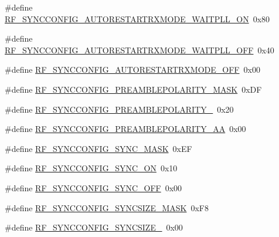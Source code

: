 \begin{DoxyCompactItemize}
\item 
\#define \mbox{\hyperlink{sx1276_regs-_fsk_8h_ab3b88dea45b78b60a8c5e684dae4ef82}{R\+F\+\_\+\+S\+Y\+N\+C\+C\+O\+N\+F\+I\+G\+\_\+\+A\+U\+T\+O\+R\+E\+S\+T\+A\+R\+T\+R\+X\+M\+O\+D\+E\+\_\+\+W\+A\+I\+T\+P\+L\+L\+\_\+\+ON}}~0x80
\item 
\#define \mbox{\hyperlink{sx1276_regs-_fsk_8h_a83c54f53204c35c3e78d90505218766b}{R\+F\+\_\+\+S\+Y\+N\+C\+C\+O\+N\+F\+I\+G\+\_\+\+A\+U\+T\+O\+R\+E\+S\+T\+A\+R\+T\+R\+X\+M\+O\+D\+E\+\_\+\+W\+A\+I\+T\+P\+L\+L\+\_\+\+O\+FF}}~0x40
\item 
\#define \mbox{\hyperlink{sx1276_regs-_fsk_8h_ac2c0f0cad363bba58dcdcc0bebbbbf56}{R\+F\+\_\+\+S\+Y\+N\+C\+C\+O\+N\+F\+I\+G\+\_\+\+A\+U\+T\+O\+R\+E\+S\+T\+A\+R\+T\+R\+X\+M\+O\+D\+E\+\_\+\+O\+FF}}~0x00
\item 
\#define \mbox{\hyperlink{sx1276_regs-_fsk_8h_aabfc2e96ddfb3844b90e9c9dc455dcaa}{R\+F\+\_\+\+S\+Y\+N\+C\+C\+O\+N\+F\+I\+G\+\_\+\+P\+R\+E\+A\+M\+B\+L\+E\+P\+O\+L\+A\+R\+I\+T\+Y\+\_\+\+M\+A\+SK}}~0x\+DF
\item 
\#define \mbox{\hyperlink{sx1276_regs-_fsk_8h_a9aa039b3727ca99daa81e3e9b6710a97}{R\+F\+\_\+\+S\+Y\+N\+C\+C\+O\+N\+F\+I\+G\+\_\+\+P\+R\+E\+A\+M\+B\+L\+E\+P\+O\+L\+A\+R\+I\+T\+Y\+\_}}~0x20
\item 
\#define \mbox{\hyperlink{sx1276_regs-_fsk_8h_a413dee0514df5bc1fa6a1aa64c08c55f}{R\+F\+\_\+\+S\+Y\+N\+C\+C\+O\+N\+F\+I\+G\+\_\+\+P\+R\+E\+A\+M\+B\+L\+E\+P\+O\+L\+A\+R\+I\+T\+Y\+\_\+\+AA}}~0x00
\item 
\#define \mbox{\hyperlink{sx1276_regs-_fsk_8h_adde21fff1779d6bb7165ccc5982e255a}{R\+F\+\_\+\+S\+Y\+N\+C\+C\+O\+N\+F\+I\+G\+\_\+\+S\+Y\+N\+C\+\_\+\+M\+A\+SK}}~0x\+EF
\item 
\#define \mbox{\hyperlink{sx1276_regs-_fsk_8h_a7ccce52a152f24047a49b53f9238ce57}{R\+F\+\_\+\+S\+Y\+N\+C\+C\+O\+N\+F\+I\+G\+\_\+\+S\+Y\+N\+C\+\_\+\+ON}}~0x10
\item 
\#define \mbox{\hyperlink{sx1276_regs-_fsk_8h_a09a78683bc189b8a3c47ec3aee9bd562}{R\+F\+\_\+\+S\+Y\+N\+C\+C\+O\+N\+F\+I\+G\+\_\+\+S\+Y\+N\+C\+\_\+\+O\+FF}}~0x00
\item 
\#define \mbox{\hyperlink{sx1276_regs-_fsk_8h_a470d9a45389bc8f22f4eee11937274fc}{R\+F\+\_\+\+S\+Y\+N\+C\+C\+O\+N\+F\+I\+G\+\_\+\+S\+Y\+N\+C\+S\+I\+Z\+E\+\_\+\+M\+A\+SK}}~0x\+F8
\item 
\#define \mbox{\hyperlink{sx1276_regs-_fsk_8h_ac7cf5fb2ab72c6b637f27980a77d49b3}{R\+F\+\_\+\+S\+Y\+N\+C\+C\+O\+N\+F\+I\+G\+\_\+\+S\+Y\+N\+C\+S\+I\+Z\+E\+\_}}~0x00
\item 

\end{DoxyCompactItemize}
